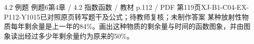 \par\noindent\begin{minipage}{\linewidth}
\begin{bankitem}{4.2 例题 例题6}{第4章 / 4.2 指数函数 / 教材 p.112 / PDF 第119页}{XJ-B1-C04-EX-P112-Y1015}{已对照原页转写题干及公式；待教师复核；未制作答案}
某种放射性物质每年剩余量是上一年的84\%。画出这种物质的剩余量与时间的函数图象，并由图象读出经过多少年剩余量约为原来的50\%。
\end{bankitem}
\end{minipage}\par\medskip
